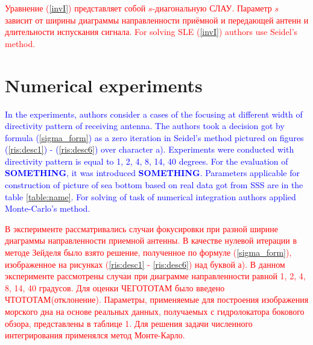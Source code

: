 \documentclass{procDDs}
\begin{document}
\textcolor{red}{Уравнение (\ref{invI}) представляет собой $s$-диагональную СЛАУ. Параметр $s$ зависит от ширины диаграммы направленности приёмной и передающей антенн и длительности испускания сигнала. For solving SLE (\ref{invI}) authors use  Seidel's method.}



\section{Numerical experiments}
\textcolor{blue}{
In the experiments, authors consider a cases of the focusing at different width of directivity pattern of receiving antenna. The authors took a decision got by formula (\ref{sigma_form}) as a zero iteration in Seidel's method pictured on figures (\ref{ris:desc1}) - (\ref{ris:desc6}) over character a). Experiments were conducted with directivity pattern is equal to  1, 2, 4, 8, 14, 40 degrees. For the evaluation of \textbf{SOMETHING}, it was introduced \textbf{SOMETHING}. 
Parameters applicable for construction of picture of sea bottom based on real data got from SSS are in the table \ref{table:name}. For solving of task of numerical integration authors applied Monte-Carlo's method.}

\textcolor{red}{В эксперименте рассматривались случаи фокусировки при разной ширине диаграммы направленности приемной антенны. В качестве нулевой итерации в методе Зейделя было взято решение, полученное по формуле (\ref{sigma_form}), изображенное на рисунках (\ref{ris:desc1} - \ref{ris:desc6}) над буквой а). В данном эксперименте рассмотрены случаи при диаграмме направленности равной 1, 2, 4, 8, 14, 40 градусов. Для оценки ЧЕГОТОТАМ было введено ЧТОТОТАМ(отклонение). 
Параметры, применяемые для построения изображения морского дна на основе реальных данных, получаемых с гидролокатора бокового обзора, представлены в таблице 1. Для решения задачи численного интегрирования применялся метод Монте-Карло.} 
\begin{table}[!ht]
	\label{table:name}
\end{table}
\end{document}
